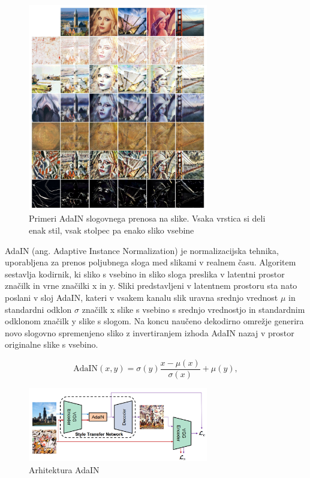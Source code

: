 \documentclass[a4paper,12pt,openright]{book}
\begin{document}
\begin{figure}[htb]
\begin{center}
  \includegraphics[width=0.7\textwidth]{images/adain_example.png}
\end{center}
  \caption{Primeri AdaIN slogovnega prenosa na slike. Vsaka vrstica si deli enak stil, vsak stolpec pa enako sliko vsebine}
  \label{AdaIN}
\end{figure}


AdaIN (ang. Adaptive Instance Normalization) \cite{huang2017adain} je normalizacijska tehnika, uporabljena za prenos poljubnega sloga med slikami v realnem času. Algoritem sestavlja kodirnik, ki sliko s vsebino in sliko sloga preslika v latentni prostor značilk in vrne značilki x in y. Sliki predstavljeni v latentnem prostoru sta nato poslani v sloj AdaIN, kateri v vsakem kanalu slik uravna srednjo vrednost $\mu$ in standardni odklon $\sigma$ značilk x slike s vsebino s srednjo vrednostjo in standardnim odklonom značilk y slike s slogom. Na koncu naučeno dekodirno omrežje generira novo slogovno spremenjeno sliko z invertiranjem izhoda AdaIN nazaj v prostor originalne slike s vsebino. 

\begin{equation}
\text{AdaIN}(x,y) = \sigma(y) \frac{x - \mu(x)}{\sigma(x)} + \mu(y),
\end{equation}

\begin{figure}[htb]
\begin{center}
  \includegraphics[width=0.7\textwidth]{images/adain_architecture.png}
\end{center}
  \caption{Arhitektura AdaIN}
  \label{AdaIN}
\end{figure}
\end{document}
